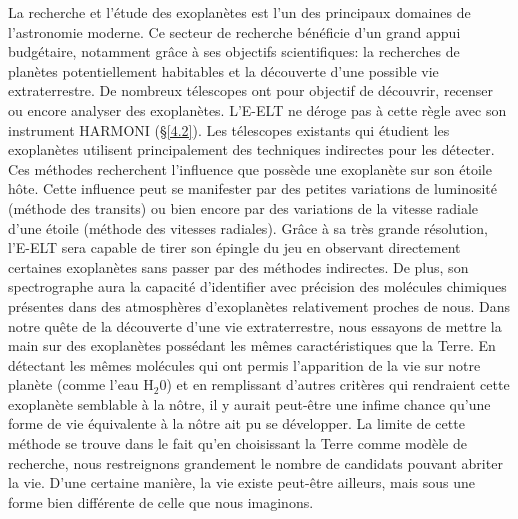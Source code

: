 La recherche et l'étude des exoplanètes est l'un des principaux domaines de l'astronomie moderne. Ce secteur de recherche bénéficie d'un grand appui budgétaire, notamment grâce à ses objectifs scientifiques: la recherches de planètes potentiellement habitables et la découverte d'une possible vie extraterrestre. De nombreux télescopes ont pour objectif de découvrir, recenser ou encore analyser des exoplanètes. L'E-ELT ne déroge pas à cette règle avec son instrument HARMONI (§\ref{4.2}). Les télescopes existants qui étudient les exoplanètes utilisent principalement des techniques indirectes pour les détecter. Ces méthodes recherchent l'influence que possède une exoplanète sur son étoile hôte. Cette influence peut se manifester par des petites variations de luminosité (méthode des transits) ou bien encore par des variations de la vitesse radiale d'une étoile (méthode des vitesses radiales). Grâce à sa très grande résolution, l'E-ELT sera capable de tirer son épingle du jeu en observant directement certaines exoplanètes sans passer par des méthodes indirectes. De plus, son spectrographe aura la capacité d'identifier avec précision des molécules chimiques présentes dans des atmosphères d'exoplanètes relativement proches de nous. Dans notre quête de la découverte d'une vie extraterrestre, nous essayons de mettre la main sur des exoplanètes possédant les mêmes caractéristiques que la Terre. En détectant les mêmes molécules qui ont permis l'apparition de la vie sur notre planète (comme l'eau H$_{2} 0$) et en remplissant d'autres critères qui rendraient cette exoplanète semblable à la nôtre, il y aurait peut-être une infime chance qu'une forme de vie équivalente à la nôtre ait pu se développer. La limite de cette méthode se trouve dans le fait qu'en choisissant la Terre comme modèle de recherche, nous restreignons grandement le nombre de candidats pouvant abriter la vie. D'une certaine manière, la vie existe peut-être ailleurs, mais sous une forme bien différente de celle que nous imaginons.










